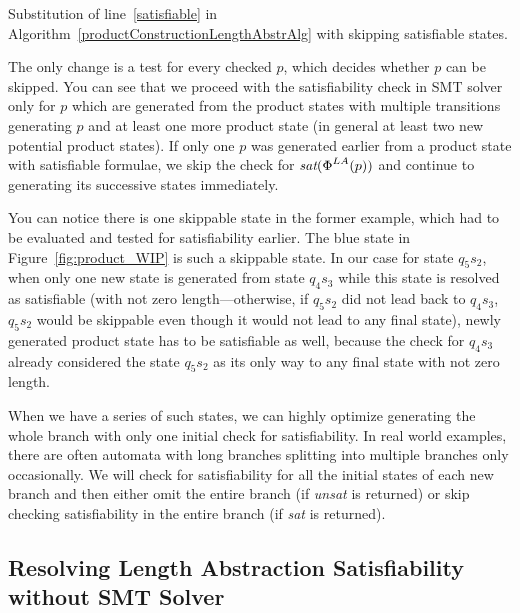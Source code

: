 \begin{algorithm}[ht]
    \caption{Substitution of line~\ref{satisfiable} in Algorithm~\ref{productConstructionLengthAbstrAlg} with skipping satisfiable states.} \label{productConstructionLengthAbstrAlgSkip}
    \DontPrintSemicolon
\end{algorithm}

The only change is a test for every checked $p$, which decides whether $p$ can be skipped. You can see that we proceed with the satisfiability check in SMT solver only for $p$ which are generated from the product states with multiple transitions generating $p$ and at least one more product state (in general at least two new potential product states). If only one $p$ was generated earlier from a product state with satisfiable formulae, we skip the check for $\emph{sat}(\emph{$\Phi$}^{LA}(p))$ and continue to generating its successive states immediately.

You can notice there is one skippable state in the former example, which had to be evaluated and tested for satisfiability earlier. The blue state in Figure~\ref{fig:product_WIP} is such a skippable state. In our case for state $q_5s_2$, when only one new state is generated from state $q_4s_3$ while this state is resolved as satisfiable (with not zero length---otherwise, if $q_5s_2$ did not lead back to $q_4s_3$, $q_5s_2$ would be skippable even though it would not lead to any final state), newly generated product state has to be satisfiable as well, because the check for $q_4s_3$ already considered the state $q_5s_2$ as its only way to any final state with not zero length.

When we have a series of such states, we can highly optimize generating the whole branch with only one initial check for satisfiability. In real world examples, there are often automata with long branches splitting into multiple branches only occasionally. We will check for satisfiability for all the initial states of each new branch and then either omit the entire branch (if \emph{unsat} is returned) or skip checking satisfiability in the entire branch (if \emph{sat} is returned).

\subsection{Resolving Length Abstraction Satisfiability without SMT Solver}

